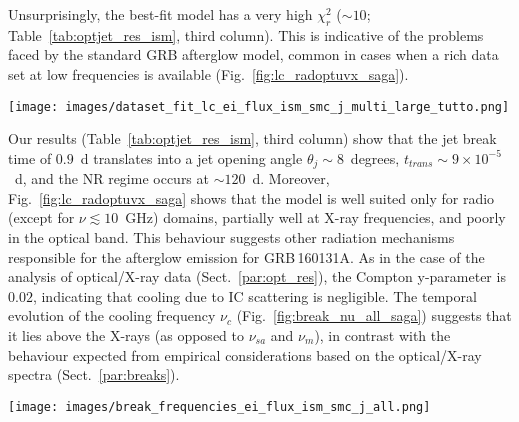 \documentclass{aa}
\begin{document}
Unsurprisingly, the best-fit model has a very high $\chi^2_r$ ($\sim 10$; Table~\ref{tab:optjet_res_ism}, third column).
This is indicative of the problems faced by the standard GRB afterglow model, common in cases when a rich data set at low frequencies is available (Fig.~\ref{fig:lc_radoptuvx_saga}).
%
\begin{figure*} %
\centering
{\texttt{[image: images/dataset\_fit\_lc\_ei\_flux\_ism\_smc\_j\_multi\_large\_tutto.png]}}
\caption{Broadband modelling of GRB\,160131A from radio to X-ray frequencies (Table~\ref{tab:optjet_res_ism}, third column).
See the caption of Fig.~\ref{fig:lc_uvoir_saga} for a full description of the modelling.
Filled circles indicate detections, and downward triangles indicate $3\sigma$ upper limits.
}
\label{fig:lc_radoptuvx_saga}
\end{figure*}
%
Our results (Table~\ref{tab:optjet_res_ism}, third column) show that the jet break time of $0.9$~d translates into a jet opening angle $\theta_{j} \sim 8$~degrees, $t_{trans} \sim 9 \times 10^{-5}$~d, and the NR regime occurs at $\sim 120$~d.
Moreover, Fig.~\ref{fig:lc_radoptuvx_saga} shows that the model is well suited only for radio (except for $\nu \lesssim 10$~GHz) domains, partially well at X-ray frequencies, and poorly in the optical band.
This behaviour suggests other radiation mechanisms responsible for the afterglow emission for GRB\,160131A.
As in the case of the analysis of optical/X-ray data (Sect.~\ref{par:opt_res}), the Compton y-parameter is $0.02$, indicating that cooling due to IC scattering is negligible.
The temporal evolution of the cooling frequency $\nu_c$ (Fig.~\ref{fig:break_nu_all_saga}) suggests that it lies above the X-rays (as opposed to $\nu_{sa}$ and $\nu_m$), in contrast with the behaviour expected from empirical considerations based on the optical/X-ray spectra (Sect.~\ref{par:breaks}).
%
\begin{figure*} %
\centering
{\texttt{[image: images/break\_frequencies\_ei\_flux\_ism\_smc\_j\_all.png]}}
\caption{Temporal evolution of the synchrotron break frequencies for afterglow emission of GRB\,160131A, based on analysis of broadband data (from radio to X-ray frequencies; Table~\ref{tab:optjet_res_ism}, third column).
See the caption of Fig.~\ref{fig:lc_uvoir_saga} for a full description of the modelling.
The self-absorption frequency produced by noncooled electrons $\nu_{ac}$ makes sense only in fast-cooling regime ($\lesssim 9 \times 10^{-5}$~d).
}
\label{fig:break_nu_all_saga}
\end{figure*}
\end{document}
